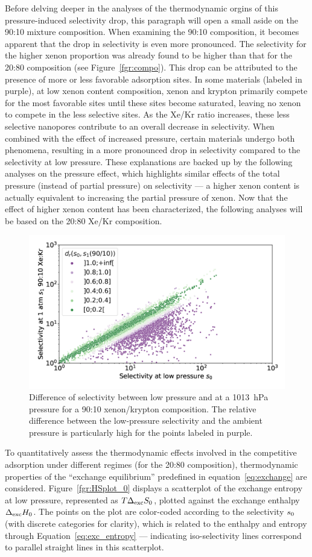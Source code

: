 \documentclass[main.tex]{subfiles}
\begin{document}
Before delving deeper in the analyses of the thermodynamic orgins of this pressure-induced selectivity drop, this paragraph will open a small aside on the 90:10 mixture composition.
When examining the 90:10 composition, it becomes apparent that the drop in selectivity is even more pronounced. The selectivity for the higher xenon proportion was already found to be higher than that for the 20:80 composition (see Figure~\ref{fgr:compo}). This drop can be attributed to the presence of more or less favorable adsorption sites. In some materials (labeled in purple), at low xenon content composition, xenon and krypton primarily compete for the most favorable sites until these sites become saturated, leaving no xenon to compete in the less selective sites. As the Xe/Kr ratio increases, these less selective nanopores contribute to an overall decrease in selectivity. When combined with the effect of increased pressure, certain materials undergo both phenomena, resulting in a more pronounced drop in selectivity compared to the selectivity at low pressure. These explanations are backed up by the following analyses on the pressure effect, which highlights similar effects of the total pressure (instead of partial pressure) on selectivity --- a higher xenon content is actually equivalent to increasing the partial pressure of xenon. Now that the effect of higher xenon content has been characterized, the following analyses will be based on the 20:80 Xe/Kr composition.

\begin{figure}[t]
  \centering
    \includegraphics[width=0.6\linewidth]{figures/2-thermo/s_0_vs_s_9010_overview_log.jpg}
    \caption{Difference of selectivity between low pressure and at a \SI{1013}{\hecto\pascal} pressure for a 90:10 xenon/krypton composition. The relative difference between the low-pressure selectivity and the ambient pressure is particularly high for the points labeled in purple.}\label{fgr:overview_9010}
\end{figure}

To quantitatively assess the thermodynamic effects involved in the competitive adsorption under different regimes (for the 20:80 composition), thermodynamic properties of the ``exchange equilibrium'' predefined in equation~\ref{eq:exchange} are considered. Figure~\ref{fgr:HSplot_0} displays a scatterplot of the exchange entropy at low pressure, represented as $T\Delta_{\text{exc}}S_{\text{0}}$, plotted against the exchange enthalpy $\Delta_{\text{exc}}H_{\text{0}}$. The points on the plot are color-coded according to the selectivity $s_{\text{0}}$ (with discrete categories for clarity), which is related to the enthalpy and entropy through Equation~\ref{eq:exc_entropy} --- indicating iso-selectivity lines correspond to parallel straight lines in this scatterplot.
  
\end{document}

